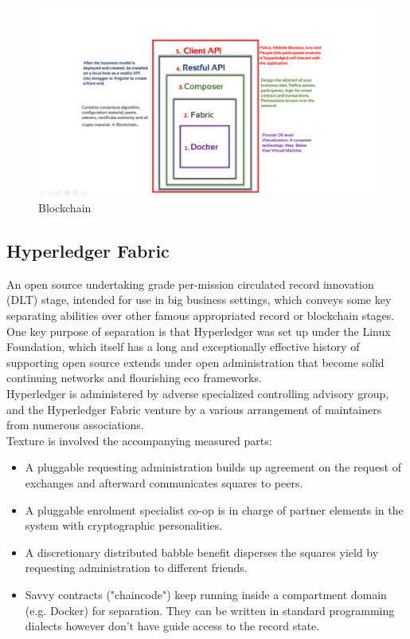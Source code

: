 \begin{figure}[h]
	\centering
	\includegraphics[scale=0.40]{figures/04.png}
	\caption{Blockchain }
	\label{fig:iste}
\end{figure}

\subsection{Hyperledger Fabric }
An open source undertaking grade per-mission circulated record innovation (DLT) stage, intended for use in big business settings, which conveys some key separating abilities over other famous appropriated record or blockchain stages. One key purpose of separation is that Hyperledger was set up under the Linux Foundation, which itself has a long and exceptionally effective history of supporting open source extends under open administration that become solid continuing networks and flourishing eco frameworks. \\
Hyperledger is administered by adverse specialized controlling advisory group, and the Hyperledger Fabric venture by a various arrangement of maintainers from numerous associations.\\ 
Texture is involved the accompanying measured parts:
\begin{itemize}
	\item A pluggable requesting administration builds up agreement on the request of exchanges and afterward communicates squares to peers.
	\item  A pluggable enrolment specialist co-op is in charge of partner elements in the system with cryptographic personalities.
	\item  A discretionary distributed babble benefit disperses the squares yield by requesting administration to different friends.
	\item  Savvy contracts ("chaincode") keep running inside a compartment domain (e.g. Docker) for separation. They can be written in standard programming dialects however don't have guide access to the record state.
	
\end{itemize}
